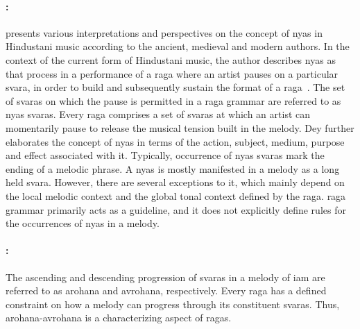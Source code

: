 \paragraph{:} \cite{Dey2008} presents various interpretations and perspectives on the concept of \gls{nyas} in Hindustani music according to the ancient, medieval and modern authors. In the context of the current form of Hindustani music, the author describes \gls{nyas} as that process in a performance of a \gls{raga} where an artist pauses on a particular \gls{svara}, in order to build and subsequently sustain the format of a \gls{raga}~\citep[p. 70]{Dey2008}. The set of \glspl{svara} on which the pause is permitted in a \gls{raga} grammar are referred to as \gls{nyas} \glspl{svara}. Every \gls{raga} comprises a set of \glspl{svara} at which an artist can momentarily pause to release the musical tension built in the melody. Dey further elaborates the concept of \gls{nyas} in terms of the action, subject, medium, purpose and effect associated with it. Typically, occurrence of \gls{nyas} \glspl{svara} mark the ending of a melodic phrase. A \gls{nyas} is mostly manifested in a melody as a long held \gls{svara}. However, there are several exceptions to it, which mainly depend on the local melodic context and the global tonal context defined by the \gls{raga}. \Gls{raga} grammar primarily acts as a guideline, and it does not explicitly define rules for the occurrences of \gls{nyas} in a melody. 


\paragraph{:}

The ascending and descending progression of \glspl{svara} in a melody of \gls{iam} are referred to as \gls{arohana} and \gls{avrohana}, respectively. Every \gls{raga} has a defined constraint on how a melody can progress through its constituent \glspl{svara}. Thus, \gls{arohana}-\gls{avrohana} is a characterizing aspect of \glspl{raga}.

